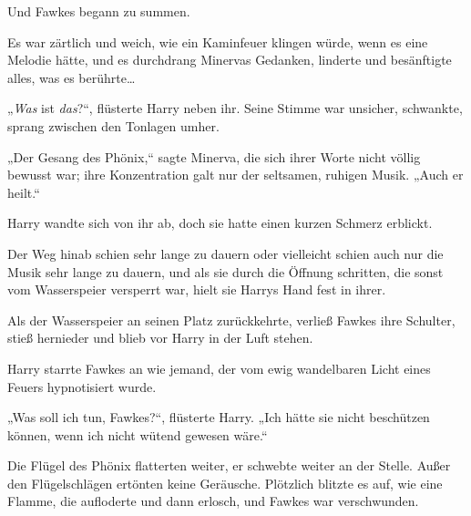 Und Fawkes begann zu summen.

Es war zärtlich und weich, wie ein Kaminfeuer klingen würde, wenn es eine Melodie hätte, und es durchdrang Minervas Gedanken, linderte und besänftigte alles, was es berührte…

„\emph{Was} ist \emph{das}?“, flüsterte Harry neben ihr. Seine Stimme war unsicher, schwankte, sprang zwischen den Tonlagen umher.

„Der Gesang des Phönix,“ sagte Minerva, die sich ihrer Worte nicht völlig bewusst war; ihre Konzentration galt nur der seltsamen, ruhigen Musik. „Auch er heilt.“

Harry wandte sich von ihr ab, doch sie hatte einen kurzen Schmerz erblickt.

Der Weg hinab schien sehr lange zu dauern oder vielleicht schien auch nur die Musik sehr lange zu dauern, und als sie durch die Öffnung schritten, die sonst vom Wasserspeier versperrt war, hielt sie Harrys Hand fest in ihrer.

Als der Wasserspeier an seinen Platz zurückkehrte, verließ Fawkes ihre Schulter, stieß hernieder und blieb vor Harry in der Luft stehen.

Harry starrte Fawkes an wie jemand, der vom ewig wandelbaren Licht eines Feuers hypnotisiert wurde.

„Was soll ich tun, Fawkes?“, flüsterte Harry. „Ich hätte sie nicht beschützen können, wenn ich nicht wütend gewesen wäre.“

Die Flügel des Phönix flatterten weiter, er schwebte weiter an der Stelle. Außer den Flügelschlägen ertönten keine Geräusche. Plötzlich blitzte es auf, wie eine Flamme, die aufloderte und dann erlosch, und Fawkes war verschwunden.

